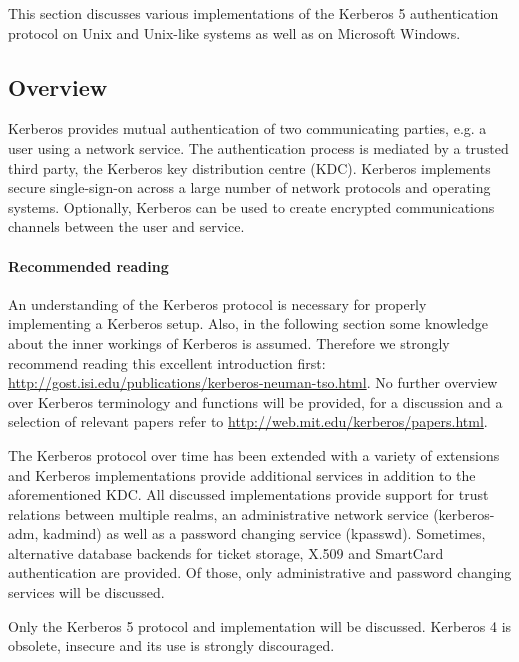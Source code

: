 This section discusses various implementations of the Kerberos 5 authentication protocol
on Unix and Unix-like systems as well as on Microsoft Windows. 

\subsection{Overview}
\label{subsection:kerberos_overview}

Kerberos provides mutual authentication of two communicating parties, e.g. a user using a network service. The authentication process is mediated by a trusted third party, the Kerberos key distribution centre (KDC). Kerberos implements secure single-sign-on across a large number of network protocols and operating systems. Optionally, Kerberos can be used to create encrypted communications channels between the user and service.

\paragraph{Recommended reading}
An understanding of the Kerberos protocol is necessary for properly implementing a Kerberos setup. Also, in the following section some knowledge about the inner workings of Kerberos is assumed. Therefore we strongly recommend reading this excellent introduction first: \url{http://gost.isi.edu/publications/kerberos-neuman-tso.html}.
No further overview over Kerberos terminology and functions will be provided, for a discussion and a selection of relevant papers refer to \url{http://web.mit.edu/kerberos/papers.html}.


The Kerberos protocol over time has been extended with a variety of extensions and Kerberos implementations provide additional services in addition to the aforementioned KDC. All discussed implementations provide support for trust relations between multiple realms, an administrative network service (kerberos-adm, kadmind) as well as a password changing service (kpasswd). Sometimes, alternative database backends for ticket storage, X.509 and SmartCard authentication are provided. Of those, only administrative and password changing services will be discussed.

Only the Kerberos 5 protocol and implementation will be discussed. Kerberos 4 is obsolete, insecure and its use is strongly discouraged.

